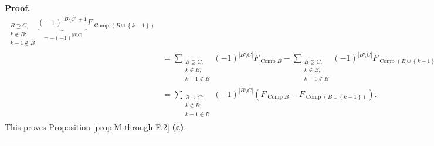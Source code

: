 \documentclass[numbers=enddot,12pt,final,onecolumn,notitlepage]{scrartcl}%
\theoremstyle{definition}
\newenvironment{proof}[1][Proof]{\noindent\textbf{#1.} }{\ \rule{0.5em}{0.5em}}
\newenvironment{verlong}{}{}
\let\sumnonlimits\sum
\renewcommand{\sum}{\sumnonlimits\limits}
\begin{document}
\begin{verlong}
\begin{proof}
\begin{align*}
_{\substack{B\supseteq C;\\k\notin B;\\k-1\notin B}}\underbrace{\left(
-1\right)  ^{\left\vert B\setminus C\right\vert +1}}_{=-\left(  -1\right)
^{\left\vert B\setminus C\right\vert }}F_{\operatorname*{Comp}\left(
B\cup\left\{  k-1\right\}  \right)  }\\
&  =\sum_{\substack{B\supseteq C;\\k\notin B;\\k-1\notin B}}\left(  -1\right)
^{\left\vert B\setminus C\right\vert }F_{\operatorname*{Comp}B}-\sum
_{\substack{B\supseteq C;\\k\notin B;\\k-1\notin B}}\left(  -1\right)
^{\left\vert B\setminus C\right\vert }F_{\operatorname*{Comp}\left(
B\cup\left\{  k-1\right\}  \right)  }\\
&  =\sum_{\substack{B\supseteq C;\\k\notin B;\\k-1\notin B}}\left(  -1\right)
^{\left\vert B\setminus C\right\vert }\left(  F_{\operatorname*{Comp}%
B}-F_{\operatorname*{Comp}\left(  B\cup\left\{  k-1\right\}  \right)
}\right)  .
\end{align*}
This proves Proposition \ref{prop.M-through-F.2} \textbf{(c)}.
\end{proof}
\end{verlong}
\end{document}
